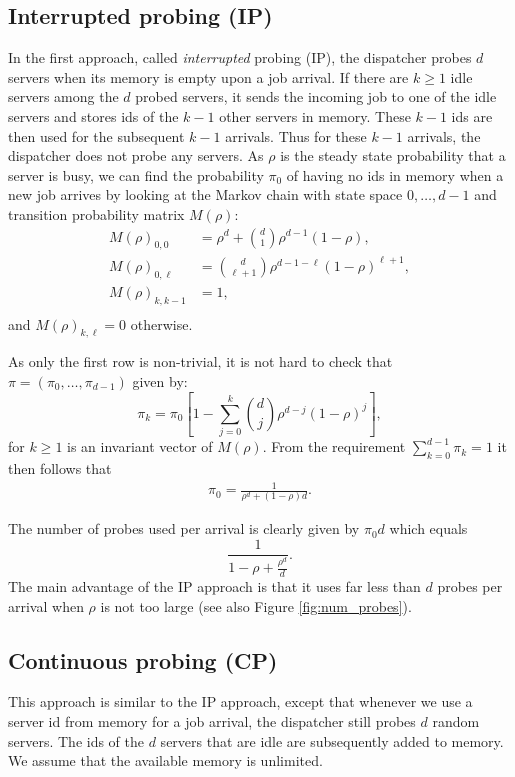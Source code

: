 \documentclass[12pt]{report}
\begin{document}
\subsection{Interrupted probing (IP)}
In the first approach, called {\it interrupted} probing (IP), the dispatcher probes $d$ servers when its memory is empty upon a job arrival. If there are $k \geq 1$ idle servers among the $d$ probed servers, 
it sends the incoming job to one of the idle servers and stores ids of the $k-1$ other
servers in memory. These $k-1$ ids are then used for the subsequent $k-1$ arrivals. 
Thus for these $k-1$ arrivals, the dispatcher does not probe any servers. 
As $\rho$ is the steady state probability that a server is busy, we can find the probability
$\pi_0$ of having no ids in memory when a new job arrives by looking at the Markov chain with state space ${0,\ldots,d-1}$ and transition probability matrix $M(\rho)$:
\begin{align*}
M(\rho)_{0,0}&= \rho^d + \binom{d}{1} \rho^{d-1} (1-\rho),\\
M(\rho)_{0,\ell}&= \binom{d}{\ell+1} \rho^{d-1-\ell} (1-\rho)^{\ell+1},\\
M(\rho)_{k,k-1}&=1,\\
\end{align*}
and $M(\rho)_{k,\ell}=0$ otherwise.

As only the first row is non-trivial, it is not hard to check that $\pi=(\pi_0,\ldots,\pi_{d-1})$
given by:
$$
\pi_k=\pi_0 \left[
1- \sum_{j=0}^k \binom{d}{j} \rho^{d-j} (1-\rho)^j
\right],
$$
for $k \geq 1$ is an invariant vector of $M(\rho)$.
From the requirement $\sum_{k=0}^{d-1} \pi_k=1$ it then follows that 
\begin{align}\label{eq:pi0IP}
\pi_0 = \frac{1}{\rho^d + (1-\rho)d}.
\end{align}

The number of probes used per arrival is clearly given by $\pi_0 d$ which equals
$$
\frac{1}{1-\rho+\frac{\rho^d}{d}}.
$$
The main advantage of the IP approach is that it uses far less than $d$ probes per arrival 
when $\rho$ is not too large (see also Figure \ref{fig:num_probes}).

\subsection{Continuous probing (CP)} \label{sec:probe_lot_memory}
This approach is similar to the IP approach, except that whenever we use a server id
from memory for a job arrival, the dispatcher still probes $d$ random servers. The ids
of the $d$ servers that are idle are subsequently added to memory. We assume that 
the available memory is unlimited. 
\end{document}
